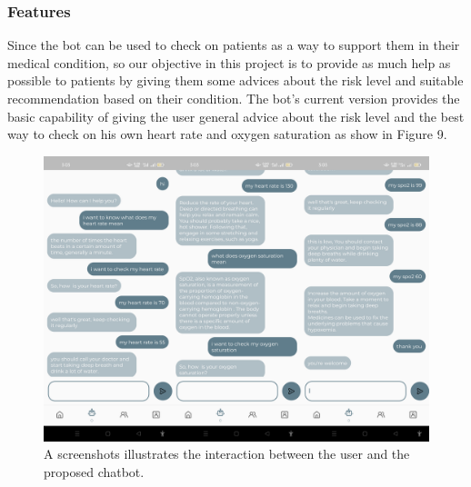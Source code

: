\documentclass{bmcart}
\begin{document}
\subsubsection*{Features}
Since the bot can be used to check on patients as a way to support them in their
medical condition, so our objective in this project is to provide as much help
as possible to patients by giving them some advices about the risk level and
suitable recommendation based on their condition. The bot's current version
provides the basic capability of giving the user general advice about the risk
level and the best way to check on his own heart rate and oxygen saturation as
show in Figure 9.
\begin{figure}[h!]
  \includegraphics[width=.9\linewidth]{png_images/chatbot.png}
  \caption{
      A screenshots illustrates the interaction between the user and the
      proposed chatbot.}
\end{figure}
\FloatBarrier
\end{document}
